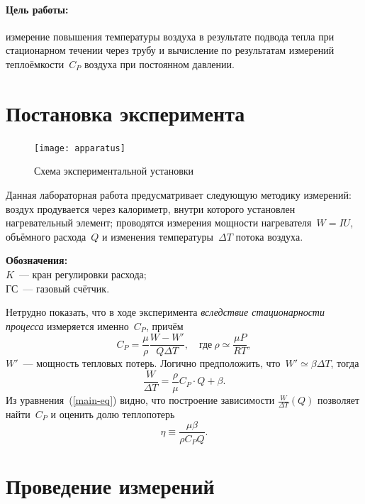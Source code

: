 \documentclass{urticle}
\begin{document}


\paragraph{Цель работы:}
	измерение повышения температуры воздуха в результате подвода тепла
		при стационарном течении через трубу
	и вычисление по результатам измерений теплоёмкости~$C_P$ воздуха
		при постоянном давлении.


\vspace{2\parskip}
\section{Постановка эксперимента}
\begin{figure}
	\vspace{-6mm}
	\centering
	\texttt{[image: apparatus]}
	\caption{Схема экспериментальной установки}
\end{figure}
Данная лабораторная работа предусматривает следующую методику измерений:
воздух продувается через калориметр, внутри которого установлен нагревательный элемент;
проводятся измерения мощности нагревателя~$W = IU$, объёмного расхода~$Q$ и изменения
температуры~$\Delta T$ потока воздуха.

\textbf{Обозначения:}\\[.5mm]
$K$~--- кран регулировки расхода;\\
ГС~--- газовый счётчик.

Нетрудно показать, что в ходе эксперимента \emph{вследствие стационарности процесса}
измеряется именно~$C_P$, причём
\begin{equation}
	C_P = \frac{\mu}{\rho}\frac{W - W'}{Q \Delta T},
\quad\text{где}~
	\rho \simeq \frac{\mu P}{RT},
\end{equation}
$W'$~--- мощность тепловых потерь. Логично предположить, что~$W' \simeq \beta \Delta T$,
тогда
\begin{equation}
\label{main-eq}
	\frac{W}{\Delta T} = \frac{\rho}{\mu} C_P \cdot Q + \beta.
\end{equation}
Из уравнения~(\ref{main-eq}) видно, что построение зависимости $\frac{W}{\Delta T}(Q)$
позволяет найти~$C_P$ и оценить долю теплопотерь
\begin{equation}
	\eta \equiv \frac{\mu\beta}{\rho C_P Q}.
\end{equation}


\section{Проведение измерений}
\end{document}
